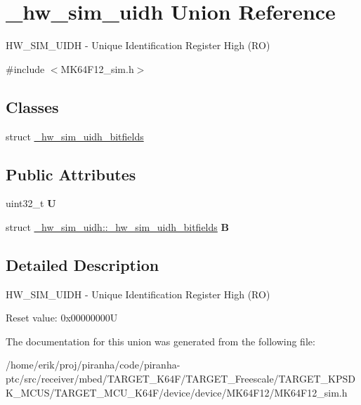 \hypertarget{union__hw__sim__uidh}{}\section{\+\_\+hw\+\_\+sim\+\_\+uidh Union Reference}
\label{union__hw__sim__uidh}


H\+W\+\_\+\+S\+I\+M\+\_\+\+U\+I\+DH -\/ Unique Identification Register High (RO)  




{\ttfamily \#include $<$M\+K64\+F12\+\_\+sim.\+h$>$}

\subsection*{Classes}
\begin{DoxyCompactItemize}
\item 
struct \hyperlink{struct__hw__sim__uidh_1_1__hw__sim__uidh__bitfields}{\+\_\+hw\+\_\+sim\+\_\+uidh\+\_\+bitfields}
\end{DoxyCompactItemize}
\subsection*{Public Attributes}
\begin{DoxyCompactItemize}
\item 
uint32\+\_\+t {\bfseries U}\hypertarget{union__hw__sim__uidh_a84c7487975da6d287bcf3fe957d94576}{}\label{union__hw__sim__uidh_a84c7487975da6d287bcf3fe957d94576}

\item 
struct \hyperlink{struct__hw__sim__uidh_1_1__hw__sim__uidh__bitfields}{\+\_\+hw\+\_\+sim\+\_\+uidh\+::\+\_\+hw\+\_\+sim\+\_\+uidh\+\_\+bitfields} {\bfseries B}\hypertarget{union__hw__sim__uidh_a9c7897a84f3e35f22e691a0fdffe679e}{}\label{union__hw__sim__uidh_a9c7897a84f3e35f22e691a0fdffe679e}

\end{DoxyCompactItemize}


\subsection{Detailed Description}
H\+W\+\_\+\+S\+I\+M\+\_\+\+U\+I\+DH -\/ Unique Identification Register High (RO) 

Reset value\+: 0x00000000U 

The documentation for this union was generated from the following file\+:\begin{DoxyCompactItemize}
\item 
/home/erik/proj/piranha/code/piranha-\/ptc/src/receiver/mbed/\+T\+A\+R\+G\+E\+T\+\_\+\+K64\+F/\+T\+A\+R\+G\+E\+T\+\_\+\+Freescale/\+T\+A\+R\+G\+E\+T\+\_\+\+K\+P\+S\+D\+K\+\_\+\+M\+C\+U\+S/\+T\+A\+R\+G\+E\+T\+\_\+\+M\+C\+U\+\_\+\+K64\+F/device/device/\+M\+K64\+F12/M\+K64\+F12\+\_\+sim.\+h\end{DoxyCompactItemize}
